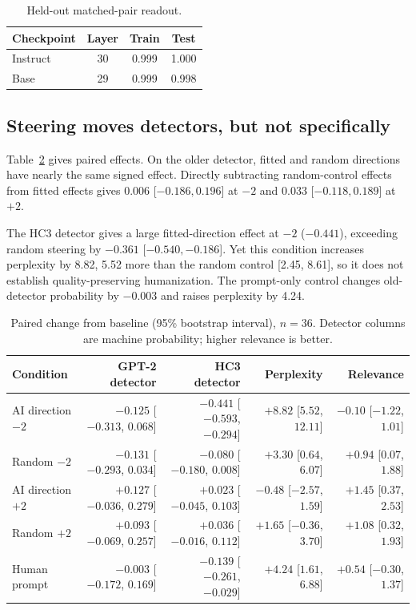 \documentclass[10pt,twocolumn]{article}
\begin{document}
\begin{table}[t]\centering\small
\caption{Held-out matched-pair readout.}\label{tab:readout}
\begin{tabular}{lccc}\toprule
Checkpoint & Layer & Train & Test\\\midrule
Instruct & 30 & 0.999 & 1.000\\
Base & 29 & 0.999 & 0.998\\\bottomrule
\end{tabular}\end{table}

\subsection{Steering moves detectors, but not specifically}
Table~\ref{tab:causal} gives paired effects. On the older detector, fitted and random directions have nearly the same signed effect. Directly subtracting random-control effects from fitted effects gives 0.006 [${-0.186},0.196$] at $-2$ and 0.033 [${-0.118},0.189$] at $+2$.

The HC3 detector gives a large fitted-direction effect at $-2$ ($-0.441$), exceeding random steering by $-0.361$ [${-0.540},{-0.186}$]. Yet this condition increases perplexity by 8.82, 5.52 more than the random control [2.45, 8.61], so it does not establish quality-preserving humanization. The prompt-only control changes old-detector probability by $-0.003$ and raises perplexity by 4.24.

\begin{table}[t]\centering\small
\caption{Paired change from baseline (95\% bootstrap interval), $n=36$. Detector columns are machine probability; higher relevance is better.}\label{tab:causal}
\begin{tabular}{lrrrr}\toprule
Condition & GPT-2 detector & HC3 detector & Perplexity & Relevance\\\midrule
AI direction $-2$ & $-0.125$ [$-0.313$, $0.068$] & $-0.441$ [$-0.593$, $-0.294$] & $+8.82$ [$5.52$, $12.11$] & $-0.10$ [$-1.22$, $1.01$]\\
Random $-2$ & $-0.131$ [$-0.293$, $0.034$] & $-0.080$ [$-0.180$, $0.008$] & $+3.30$ [$0.64$, $6.07$] & $+0.94$ [$0.07$, $1.88$]\\
AI direction $+2$ & $+0.127$ [$-0.036$, $0.279$] & $+0.023$ [$-0.045$, $0.103$] & $-0.48$ [$-2.57$, $1.59$] & $+1.45$ [$0.37$, $2.53$]\\
Random $+2$ & $+0.093$ [$-0.069$, $0.257$] & $+0.036$ [$-0.016$, $0.112$] & $+1.65$ [$-0.36$, $3.70$] & $+1.08$ [$0.32$, $1.93$]\\
Human prompt & $-0.003$ [$-0.172$, $0.169$] & $-0.139$ [$-0.261$, $-0.029$] & $+4.24$ [$1.61$, $6.88$] & $+0.54$ [$-0.30$, $1.37$]\\\bottomrule
\end{tabular}\end{table}
\end{document}
